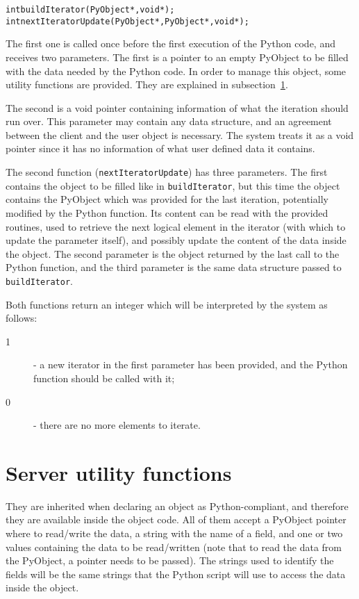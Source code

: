 \begin{alltt}
int buildIterator(PyObject*, void*);
int nextIteratorUpdate(PyObject*, PyObject*, void*);
\end{alltt}

The first one is called once before the first execution of the Python code, and
receives two parameters. The first is a pointer to an empty PyObject to be filled with
the data needed by the Python code. In order to manage this object, some utility
functions are provided. They are explained in subsection~\ref{pythonUtilityFuncs}.

The second is a void pointer containing information of what the iteration should
run over. This parameter may contain any data structure, and an agreement between the
client and the user object is necessary. The system treats it as a void pointer
since it has no information of what user defined data it contains.

The second function (\texttt{nextIteratorUpdate}) has three parameters. The
first contains the object to be filled like in \texttt{buildIterator}, but this
time the object contains the PyObject which was provided for the last iteration,
potentially modified by the Python function. Its content can be read with the
provided routines, used to retrieve the next logical element in the iterator
(with which to update the parameter itself), and possibly update the content of
the data inside the \charmpp{} object. The second parameter is the object
returned by the last call to the Python function, and the third parameter is the
same data structure passed to \texttt{buildIterator}.

Both functions return an integer which will be interpreted by the system as follows:
\begin{description}
\item[1] - a new iterator in the first parameter has been provided, and the Python function should be called with it;
\item[0] - there are no more elements to iterate.
\end{description}

\section{Server utility functions}
\label{pythonUtilityFuncs}

They are inherited when declaring an object as Python-compliant, and therefore
they are available inside the object code. All of them accept a PyObject pointer
where to read/write the data, a string with the name of a field, and one or two
values containing the data to be read/written (note that to read the data from
the PyObject, a pointer needs to be passed). The strings used to identify the
fields will be the same strings that the Python script will use to access the
data inside the object.

